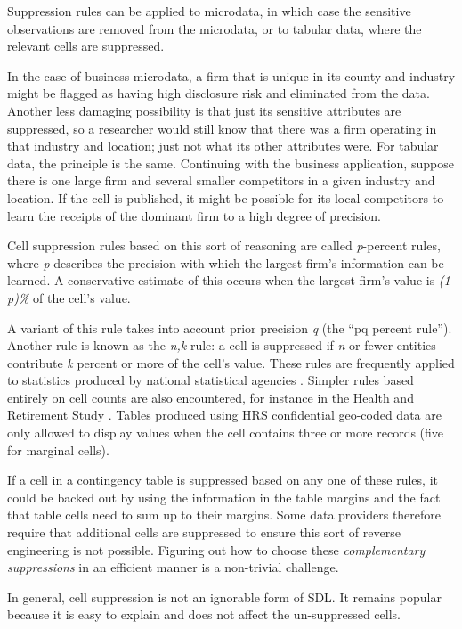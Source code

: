 \documentclass[
]{book}
\begin{document}
Suppression rules can be applied to microdata, in which case the sensitive observations are removed from the microdata, or to tabular data, where the relevant cells are suppressed.

In the case of business microdata, a firm that is unique in its county and industry might be flagged as having high disclosure risk and eliminated from the data. Another less damaging possibility is that just its sensitive attributes are suppressed, so a researcher would still know that there was a firm operating in that industry and location; just not what its other attributes were. For tabular data, the principle is the same. Continuing with the business application, suppose there is one large firm and several smaller competitors in a given industry and location. If the cell is published, it might be possible for its local competitors to learn the receipts of the dominant firm to a high degree of precision.

Cell suppression rules based on this sort of reasoning are called \emph{p}-percent rules, where \emph{p} describes the precision with which the largest firm's information can be learned. A conservative estimate of this occurs when the largest firm's value is \emph{(1-p)\%} of the cell's value.

A variant of this rule takes into account prior precision \emph{q} (the ``pq percent rule''). Another rule is known as the \emph{n,k} rule: a cell is suppressed if \emph{n} or fewer entities contribute \emph{k} percent or more of the cell's value. These rules are frequently applied to statistics produced by national statistical agencies \citep{harris-kojetin_statistical_2005}. Simpler rules based entirely on cell counts are also encountered, for instance in the Health and Retirement Study \citep{health_and_retirement_study_disclosure_nodate}. Tables produced using HRS confidential geo-coded data are only allowed to display values when the cell contains three or more records (five for marginal cells).

If a cell in a contingency table is suppressed based on any one of these rules, it could be backed out by using the information in the table margins and the fact that table cells need to sum up to their margins. Some data providers therefore require that additional cells are suppressed to ensure this sort of reverse engineering is not possible. Figuring out how to choose these \emph{complementary suppressions} in an efficient manner is a non-trivial challenge.

In general, cell suppression is not an ignorable form of SDL. It remains popular because it is easy to explain and does not affect the un-suppressed cells.
\end{document}
